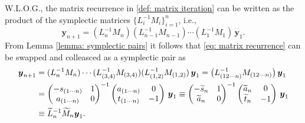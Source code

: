 \documentclass[11pt]{article}
\numberwithin{equation}{section}
\begin{document}
W.L.O.G., the matrix recurrence in \eqref{def: matrix iteration} can be written as the product of the symplectic matrices
$\{L_i^{-1} M_i\}_{i=1}^n$, i.e.,
\begin{equation} \label{eq: matrix recurrence}
\boldsymbol{y}_{n+1}
=
(L_n^{-1}M_n)(L_{n-1}^{-1}M_{n-1})\cdots(L_1^{-1}M_1)\,\boldsymbol{y}_1.
\end{equation}
From Lemma \ref{lemma: symplectic pairs} it follows that \eqref{eq: matrix recurrence} can be swapped and colleasced as a symplectic pair as
\begin{align} \label{dv: symplectic pair swap and collapse}
    \boldsymbol{y}_{n+1} &=
(L_n^{-1}M_n)\cdots(L_{(3,4)}^{-1}M_{(3,4)})(L_{(1,2)}^{-1}M_{(1,2)})\,\boldsymbol{y}_1
=
\big(L_{(12\cdots n)}^{-1} M_{(1 2\cdots n)}\big)\,\boldsymbol{y}_1 \notag\\
&= \begin{pmatrix}
- s_{(1 \cdots n)} & 1 \\
a_{(1 \cdots n)} & 0
\end{pmatrix}^{-1}
\begin{pmatrix}
a_{(1\cdots n)} & 0 \\
t_{(1\cdots n)} & -1
\end{pmatrix}
\,\boldsymbol{y}_1
 \equiv
\begin{pmatrix}
- \widetilde{s}_n & 1\\
\widetilde{a}_n & 0
\end{pmatrix}^{-1}
\begin{pmatrix}
\widetilde{a}_n & 0 \\
\widetilde{t}_n & -1
\end{pmatrix}
\,\boldsymbol{y}_1 \notag \\
& \equiv \widetilde{L}_n^{-1}\widetilde{M}_n\boldsymbol{y}_1.
\end{align}
\end{document}
